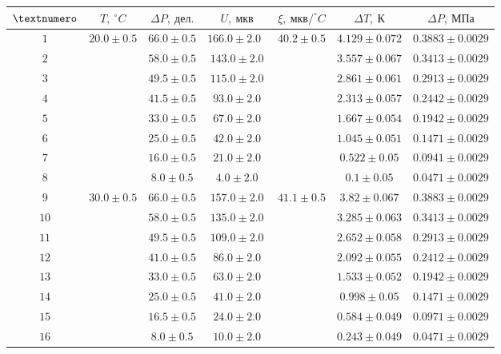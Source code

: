 \begin{tabular}{|c|c|c|c|c|c|c|}
  \hline
  $\textnumero$ & $T,\ ^\circ C$ & $\Delta P,\ дел.$ & $U,\ мкв$ & $\xi,\ мкв/^\circ C$ & $\Delta T,\ К$ & $\Delta P,\ МПа$\\ \hline
  $1$ & \multirow{8}{*}{$20.0 \pm 0.5$}\
                   & $66.0 \pm 0.5$ & $166.0 \pm 2.0$\ & \multirow{8}{*}{$40.2 \pm 0.5$}\
                                                               & $4.129 \pm 0.072$ & $0.3883 \pm 0.0029$\\ \cline{1-1} \cline{3-4} \cline{6-7}
  $2$ & & $58.0 \pm 0.5$ & $143.0 \pm 2.0$ & & $3.557 \pm 0.067$ & $0.3413 \pm 0.0029$\\ \cline{1-1} \cline{3-4} \cline{6-7}
  $3$ & & $49.5 \pm 0.5$ & $115.0 \pm 2.0$ & & $2.861 \pm 0.061$ & $0.2913 \pm 0.0029$\\ \cline{1-1} \cline{3-4} \cline{6-7}
  $4$ & & $41.5 \pm 0.5$ & $93.0 \pm 2.0$ & & $2.313 \pm 0.057$ & $0.2442 \pm 0.0029$\\ \cline{1-1} \cline{3-4} \cline{6-7}
  $5$ & & $33.0 \pm 0.5$ & $67.0 \pm 2.0$ & & $1.667 \pm 0.054$ & $0.1942 \pm 0.0029$\\ \cline{1-1} \cline{3-4} \cline{6-7}
  $6$ & & $25.0 \pm 0.5$ & $42.0 \pm 2.0$ & & $1.045 \pm 0.051$ & $0.1471 \pm 0.0029$\\ \cline{1-1} \cline{3-4} \cline{6-7}
  $7$ & & $16.0 \pm 0.5$ & $21.0 \pm 2.0$ & & $0.522 \pm 0.05$ & $0.0941 \pm 0.0029$\\ \cline{1-1} \cline{3-4} \cline{6-7}
  $8$ & & $8.0 \pm 0.5$ & $4.0 \pm 2.0$ & & $0.1 \pm 0.05$ & $0.0471 \pm 0.0029$\\ \hline

  $9$ & \multirow{8}{*}{$30.0 \pm 0.5$}\
                   & $66.0 \pm 0.5$ & $157.0 \pm 2.0$ & \multirow{8}{*}{$41.1 \pm 0.5$}\
                                                               & $3.82 \pm 0.067$ & $0.3883 \pm 0.0029$\\ \cline{1-1} \cline{3-4} \cline{6-7}
  $10$ & & $58.0 \pm 0.5$ & $135.0 \pm 2.0$ & & $3.285 \pm 0.063$ & $0.3413 \pm 0.0029$\\ \cline{1-1} \cline{3-4} \cline{6-7}
  $11$ & & $49.5 \pm 0.5$ & $109.0 \pm 2.0$ & & $2.652 \pm 0.058$ & $0.2913 \pm 0.0029$\\ \cline{1-1} \cline{3-4} \cline{6-7}
  $12$ & & $41.0 \pm 0.5$ & $86.0 \pm 2.0$ & & $2.092 \pm 0.055$ & $0.2412 \pm 0.0029$\\ \cline{1-1} \cline{3-4} \cline{6-7}
  $13$ & & $33.0 \pm 0.5$ & $63.0 \pm 2.0$ & & $1.533 \pm 0.052$ & $0.1942 \pm 0.0029$\\ \cline{1-1} \cline{3-4} \cline{6-7}
  $14$ & & $25.0 \pm 0.5$ & $41.0 \pm 2.0$ & & $0.998 \pm 0.05$ & $0.1471 \pm 0.0029$\\ \cline{1-1} \cline{3-4} \cline{6-7}
  $15$ & & $16.5 \pm 0.5$ & $24.0 \pm 2.0$ & & $0.584 \pm 0.049$ & $0.0971 \pm 0.0029$\\ \cline{1-1} \cline{3-4} \cline{6-7}
  $16$ & & $8.0 \pm 0.5$ & $10.0 \pm 2.0$ & & $0.243 \pm 0.049$ & $0.0471 \pm 0.0029$\\ \hline


\end{tabular}
